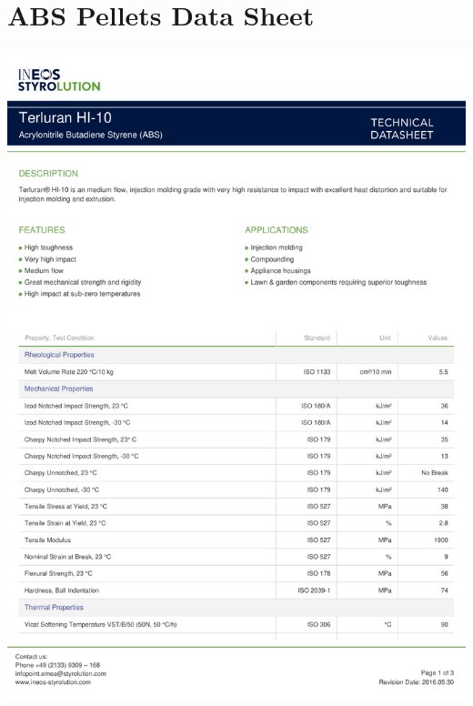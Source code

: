 \renewcommand{\baselinestretch}{2}
\chapter{ABS Pellets Data Sheet}
\label{App:ABS}
\newpage
\centering
\includegraphics[page=1,scale=0.71]{ABS_Datasheet.pdf}
